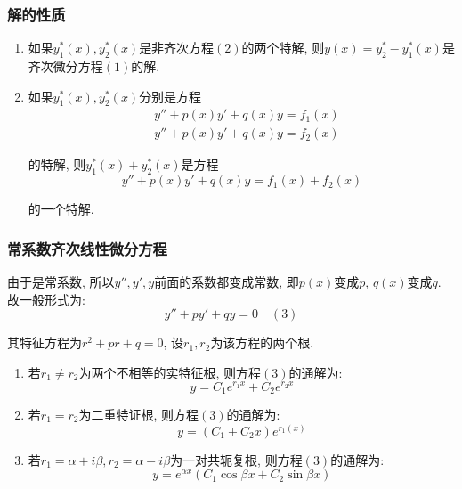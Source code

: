 \subsubsection{解的性质}
\begin{enumerate}
\item 如果$ y_{1}^{*}(x), y_{2}^{*}(x) $是非齐次方程$ (2) $的两个特解, 则$ y(x)=y_{2}^{*}-y_{1}^{*}(x) $是齐次微分方程$ (1) $的解.
\item 如果$ y_{1}^{*}(x),y_{2}^{*}(x) $分别是方程
\begin{equation*}
\begin{aligned}
& y''+p(x)y'+q(x)y=f_{1}(x) \\
& y''+p(x)y'+q(x)y=f_{2}(x)
\end{aligned}
\end{equation*}\par
的特解, 则$ y_{1}^{*}(x)+y_{2}^{*}(x) $是方程
\begin{equation*}
y''+p(x)y'+q(x)y=f_{1}(x)+f_{2}(x)
\end{equation*}\par
的一个特解.
\end{enumerate}
\subsubsection{常系数齐次线性微分方程}
由于是常系数, 所以$ y'',y',y $前面的系数都变成常数, 即$ p(x) $变成$ p $, $ q(x) $变成$ q $. 故一般形式为:
\begin{equation*}
y''+py'+qy=0 \quad (3)
\end{equation*}\par
其特征方程为$ r^{2}+pr+q=0 $, 设$ r_{1}, r_{2} $为该方程的两个根.
\begin{enumerate}
\item 若$ r_{1}\neq r_{2} $为两个不相等的实特征根, 则方程$ (3) $的通解为:
\begin{equation*}
y=C_{1}e^{r_{1}x}+C_{2}e^{r_{2}x}
\end{equation*}
\item 若$ r_{1}=r_{2} $为二重特证根, 则方程$ (3) $的通解为:
\begin{equation*}
y=(C_{1}+C_{2}x)e^{r_{1}(x)}
\end{equation*}
\item 若$ r_{1}=\alpha+i\beta, r_{2}=\alpha-i\beta $为一对共轭复根, 则方程$ (3) $的通解为:
\begin{equation*}
y=e^{\alpha x}(C_{1}\cos \beta x+C_{2}\sin \beta x)
\end{equation*}
\end{enumerate}
